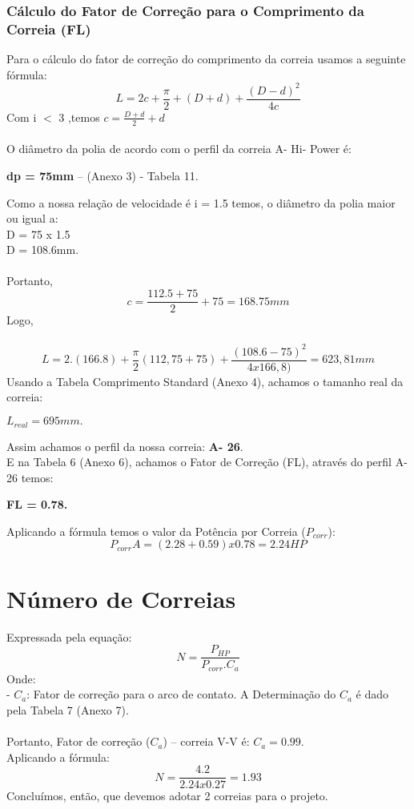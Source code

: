 \documentclass[11pt,a4paper]{report}
\begin{document}
\subsubsection{C\'alculo do Fator de Corre\c{c}\~ao para o Comprimento da Correia (FL)}
Para o c\'alculo do fator de corre\c{c}\~ao do comprimento da correia usamos a
seguinte f\'ormula:\\
$$L=2c+\frac{\pi}{2}+(D+d)+\frac{(D-d)^2}{4c}$$
Com i $<$ 3 ,temos $c=\frac{D+d}{2}+d$ \\\\
O di\^ametro da polia de acordo com o perfil da correia A- Hi- Power é:
\begin{center}
\textbf{dp = 75mm} -- (Anexo 3) - Tabela 11.
\end{center}
Como a nossa rela\c{c}\~ao de velocidade é i = 1.5 temos, o di\^ametro da polia
maior ou igual a:\\
D = 75 x 1.5\\
D = 108.6mm.\\\\
Portanto,\\
$$c=\frac{112.5+75}{2}+75=168.75mm$$
Logo,\\\\
$$L=2.(166.8)+\frac{\pi}{2}(112,75+75)+\frac{(108.6-75)^2}{4x166,8)}=623,81mm$$
Usando a Tabela Comprimento Standard (Anexo 4), achamos o tamanho
real da correia:\\
\begin{center}
$L_{real} = 695 mm.$\\
\end{center}
Assim achamos o perfil da nossa correia: \textbf{A- 26}.\\
E na Tabela 6 (Anexo 6), achamos o Fator de Corre\c{c}\~ao (FL), atrav\'es do
perfil A- 26 temos:\\
\begin{center}
\textbf{FL = 0.78.}
\end{center}
Aplicando a f\'ormula temos o valor da Pot\^encia por Correia ($P_{corr}$):\\
$$P_{corr}A = (2.28 +0.59) x 0.78=2.24HP$$
\section{N\'umero de Correias}
Expressada pela equa\c{c}\~ao:\\
$$N=\frac{P_{HP}}{P_{corr}. C_a}$$
Onde:\\
- $C_a$: Fator de corre\c{c}\~ao para o arco de contato. A Determina\c{c}\~ao do $C_a$ é dado
pela Tabela 7 (Anexo 7).\\\\
Portanto, Fator de corre\c{c}\~ao ($C_a$) -- correia V-V é: $C_a = 0.99.$\\
Aplicando a f\'ormula:\\
$$N=\frac{4.2}{2.24x0.27}=1.93$$
Conclu\'imos, ent\~ao, que devemos adotar 2 correias para o projeto.\\
\end{document}
